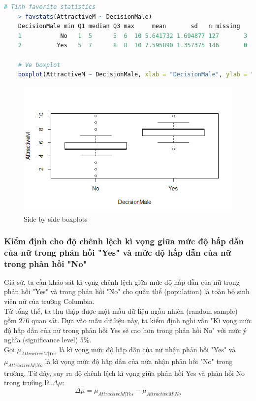 \documentclass[a4paper,12pt]{article}
\begin{document}
	\begin{lstlisting}[language = R]
	# Tinh favorite statistics
	> favstats(AttractiveM ~ DecisionMale)
	DecisionMale min Q1 median Q3 max     mean       sd   n missing
	1           No   1  5      5  6  10 5.641732 1.694877 127       3
	2          Yes   5  7      8  8  10 7.595890 1.357375 146       0
	
	# Ve boxplot
	boxplot(AttractiveM ~ DecisionMale, xlab = "DecisionMale", ylab = "AttractiveM")
	\end{lstlisting}
	\begin{figure}[H]
		\centering
		\includegraphics[width=0.7\linewidth]{Rplot5}
		\caption{Side-by-side boxplots}
		\label{fig:rplot5}
	\end{figure}
	
	\subsubsection{Kiểm định cho độ chênh lệch kì vọng giữa mức độ hấp dẫn của nữ trong phản hồi "Yes" và mức độ hấp dẫn của nữ trong phản hồi "No"}
	
	Giả sử, ta cần khảo sát kì vọng chênh lệch giữa mức độ hấp dẫn của nữ trong phản hồi "Yes" và trong phản hồi "No" cho quần thể (population) là toàn bộ sinh viên nữ của trường Columbia.\\
	
	Từ tổng thể, ta thu thập được một mẫu dữ liệu ngẫu nhiên (random sample) gồm 276 quan sát. Dựa vào mẫu dữ liệu này, ta kiểm định nghi vấn "Kì vọng mức độ hấp dẫn của nữ trong phản hồi Yes sẽ cao hơn trong phản hồi No" với mức ý nghĩa (significance level) 5\%.\\
	
	Gọi $\mu_{AttractiveM|Yes}$ là kì vọng mức độ hấp dẫn của nữ nhận phản hồi "Yes" và $\mu_{AttractiveM|No}$ là kì vọng mức độ hấp dẫn của nữa nhận phản hồi "No" trong trường. Từ đây, suy ra độ chênh lệch kì vọng giữa phản hồi Yes và phản hồi No trong trường là $\Delta\mu$:
	$$\Delta\mu = \mu_{AttractiveM|Yes} - \mu_{AttractiveM|No}$$
	
\end{document}
